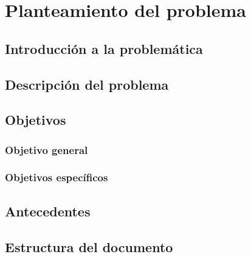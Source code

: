 \section{Planteamiento del problema}

\subsection{Introducción a la problemática}

\subsection{Descripción del problema}

\subsection{Objetivos}
\subsubsection{Objetivo general}
\subsubsection{Objetivos específicos}

\subsection{Antecedentes}

\subsection{Estructura del documento}
